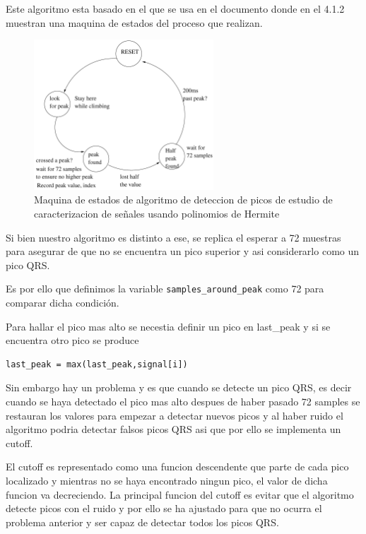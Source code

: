 Este algoritmo esta basado en el que se usa en el documento \cite{desai2021low} 
donde en el 4.1.2 muestran una maquina de estados del proceso que realizan.

\begin{figure}[h!]
    \centering
    \includegraphics[width=0.6\textwidth]{./Images/img_algoritmo/fsm_mdpi.png}
    \caption{Maquina de estados de algoritmo de deteccion de picos de estudio de caracterizacion de señales usando polinomios de Hermite}
    \label{fig:fsm_mpdi}
\end{figure}

Si bien nuestro algoritmo es distinto a ese, se replica el esperar a 72 muestras
para asegurar de que no se encuentra un pico superior y asi considerarlo como un pico QRS.

Es por ello que definimos la variable \lstinline|samples_around_peak| como 72 para comparar dicha condición.

Para hallar el pico mas alto se necestia definir un pico en last\_peak y si se encuentra otro pico se produce

\lstset{language=python, breaklines=true, basicstyle=\footnotesize}
\begin{lstlisting}[frame=single]
last_peak = max(last_peak,signal[i])
\end{lstlisting}

Sin embargo hay un problema y es que cuando se detecte un pico QRS, es decir cuando se haya detectado el pico 
mas alto despues de haber pasado 72 samples se restauran los valores para empezar a detectar nuevos picos y al
haber ruido el algoritmo podria detectar falsos picos QRS asi que por ello se implementa un cutoff.

El cutoff es representado como una funcion descendente que parte de cada pico localizado y mientras no se haya
encontrado ningun pico, el valor de dicha funcion va decreciendo. La principal funcion del cutoff es evitar que
el algoritmo detecte picos con el ruido y por ello se ha ajustado para que no ocurra el problema anterior y 
ser capaz de detectar todos los picos QRS.\@

